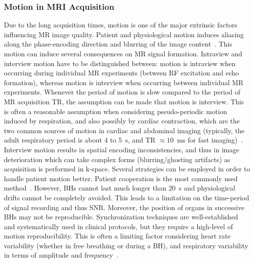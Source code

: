 \subsubsection{Motion in MRI Acquisition} \label{SubSubSec:IntraviewandInterviewMotion}
Due to the long acquisition times, motion is one of the major extrinsic factors influencing MR image quality. Patient and physiological motion induces aliasing along the phase-encoding direction and blurring of the image content~\cite{Kuestner2022}.
This motion can induce several consequences on MR signal formation. Intraview and interview motion have to be distinguished between: motion is intraview when occurring during individual MR experiments (between RF excitation and echo formation), whereas motion is interview when occurring between individual MR experiments. Whenever the period of motion is slow compared to the period of MR acquisition 
TR, the assumption can be made that motion is interview. This is often a reasonable assumption when considering pseudo-periodic motion induced by respiration, and also possibly by cardiac contraction, which are the two common sources of motion in cardiac and abdominal imaging (typically, the adult respiratory period is about 4 to 5~s, and TR $\approx 10$~ms for fast imaging)~\cite{GRICS}. Interview motion results in spatial encoding inconsistencies, and thus in image deterioration which can take complex forms (blurring/ghosting artifacts) as acquisition is performed in k-space. Several strategies can be employed in order to handle patient motion better. Patient cooperation is the most commonly used method~\cite{GRICS}. However, BHs cannot last much longer than 20~s and physiological drifts cannot be completely avoided. This leads to a limitation on the time-period of signal recording and thus SNR. Moreover, the position of organs in successive BHs may not be reproducible. Synchronization techniques are well-established and systematically used in clinical protocols, but they require a high-level of motion reproducibility. This is often a limiting factor considering heart rate variability (whether in free breathing or during a BH), and respiratory variability in terms of amplitude and frequency~\cite{GRICS}. 

